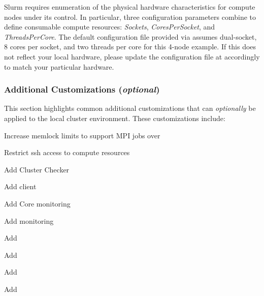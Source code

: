 \documentclass[letterpaper]{article}
\begin{document}
\begin{center}
\begin{tcolorbox}[]
  \small Slurm requires enumeration of the physical hardware characteristics
  for compute nodes under its control. In particular, three configuration
  parameters combine to define consumable compute resources: {\em Sockets},
  {\em CoresPerSocket}, and {\em ThreadsPerCore}. The default configuration
  file provided via \OHPC{} assumes dual-socket, 8 cores per socket, and two
  threads per core for this 4-node example. If this does not reflect your local
  hardware, please update the configuration file at
   accordingly to match your particular hardware.
\end{tcolorbox}
\end{center}




\subsubsection{Additional Customizations ({\em optional})} \label{sec:addl_customizations}

This section highlights common additional customizations that
can {\em optionally} be applied to the
local cluster environment. These customizations include:

\begin{itemize*}
\item Increase memlock limits to support MPI jobs over \InfiniBand{}
\item Restrict ssh access to compute resources
\item Add Cluster Checker
\item Add \Lustre{} client
\item Add \Nagios{} Core monitoring
\item Add \Ganglia{} monitoring
\item Add \clustershell{}
\item Add \mrsh{}
\item Add \genders{}
\item Add \powerman{}
\end{itemize*}
\end{document}
